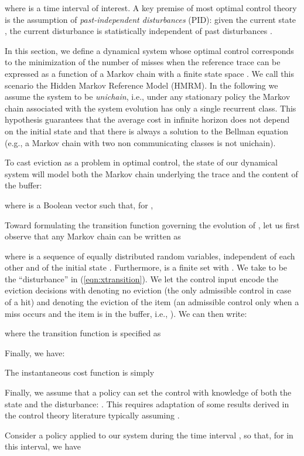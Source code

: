 \documentclass[11pt,a4paper]{article}
\theoremstyle{definition}
\theoremstyle{remark}
\begin{document}
where  is a time interval of interest.  A key premise of most optimal control
theory is the assumption of \emph{past-independent disturbances} (PID): given the
current state , the current disturbance  is statistically independent
of past disturbances .

In this section, we define a dynamical system whose optimal control
corresponds to the minimization of the number of misses when the
reference trace can be expressed as a function  of a
Markov chain  with a finite state space .  We call this
scenario the Hidden Markov Reference Model (HMRM).
In the following we assume the system to be \emph{unichain}, i.e., under any
stationary policy the Markov chain associated with the system evolution has only
a single recurrent class. This hypothesis guarantees that the average cost in
infinite horizon does not depend on the initial state and that there is always a
solution to the Bellman equation (e.g., a Markov chain with two non
communicating classes is not unichain).

To cast eviction as a problem in optimal control, the state of our
dynamical system will model both the Markov chain underlying the trace
and the content of the buffer:

where  is a Boolean vector such that, for ,


Toward formulating the transition function governing the evolution of
, let us first observe that any Markov chain can be written
as

where  is a sequence of equally distributed random variables,
independent of each other and of the initial state  \cite{LevinPW09}.
Furthermore,  is a finite set with .  We take  to
be the ``disturbance'' in (\ref{eqn:xtransition}).  We let the control input
 encode the eviction decisions with  denoting no
eviction (the only admissible control in case of a hit) and  denoting the
eviction of the item  (an admissible control only when a miss occurs and the
item  is in the buffer, i.e., ). We can then write:

where the transition function  is specified as

Finally, we have:

The instantaneous cost function  is simply

Finally, we assume that a policy can set the control  with
knowledge of both the state and the disturbance: .
This requires adaptation of some results derived in the control theory
literature typically assuming .

Consider a policy 
applied to our system during the time interval ,
so that, for  in this interval, we have
\end{document}
